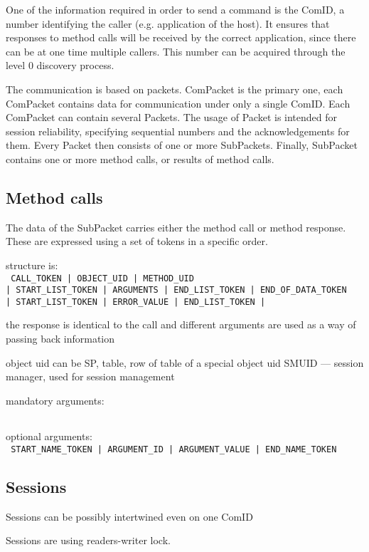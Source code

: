 One of the information required in order to send a command is the ComID, a number identifying the caller (e.g. application of the host). It ensures that responses to method calls will be received by the correct application, since there can be at one time multiple callers. This number can be acquired through the level 0 discovery process.

The communication is based on packets. ComPacket is the primary one, each ComPacket contains data for communication under only a single ComID. Each ComPacket can contain several Packets. The usage of Packet is intended for session reliability, specifying sequential numbers and the acknowledgements for them. Every Packet then consists of one or more SubPackets. Finally, SubPacket contains one or more method calls, or results of method calls.


\subsection{Method calls}

The data of the SubPacket carries either the method call or method response. %
These are expressed using a set of tokens in a specific order.

structure is: \\
\verb# CALL_TOKEN | OBJECT_UID | METHOD_UID# \\
\verb#| START_LIST_TOKEN | ARGUMENTS | END_LIST_TOKEN | END_OF_DATA_TOKEN# \\
\verb#| START_LIST_TOKEN | ERROR_VALUE | END_LIST_TOKEN | #

the response is identical to the call and different arguments are used as a way of passing back information

object uid can be SP, table, row of table of a special object uid SMUID --- session manager, used for session management

mandatory arguments: \\
\verb#  #

optional arguments: \\
\verb# START_NAME_TOKEN | ARGUMENT_ID | ARGUMENT_VALUE | END_NAME_TOKEN # 


\subsection{Sessions}

Sessions can be possibly intertwined even on one ComID

Sessions are using readers-writer lock.

